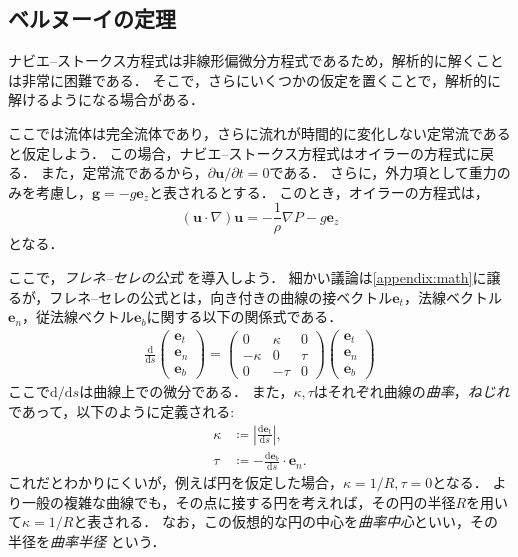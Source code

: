 \documentclass[uplatex,dvipdfmx,a4j,11pt]{jsreport}
\newcommand{\e}{\mathbf{e}} %
\newcommand{\diff}{\mathrm{d}} %
\numberwithin{equation}{chapter}
\begin{document}
\subsection{ベルヌーイの定理}

ナビエ--ストークス方程式は非線形偏微分方程式であるため，解析的に解くことは非常に困難である．
そこで，さらにいくつかの仮定を置くことで，解析的に解けるようになる場合がある．

ここでは流体は完全流体であり，さらに流れが時間的に変化しない定常流であると仮定しよう．
この場合，ナビエ--ストークス方程式はオイラーの方程式に戻る．
また，定常流であるから，$\partial \mathbf{u}/\partial t = 0$である．
さらに，外力項として重力のみを考慮し，$\mathbf{g} = -g \e_z$と表されるとする．
このとき，オイラーの方程式は， 
\begin{equation*}
  (\mathbf{u}\cdot \nabla)\mathbf{u} = -\frac{1}{\rho} \nabla P - g \e_z
\end{equation*}
となる．

ここで，\emph{フレネ--セレの公式} を導入しよう．
細かい議論は\cref{appendix:math}に譲るが，フレネ--セレの公式とは，向き付きの曲線の接ベクトル$\e_t$，法線ベクトル$\e_n$，従法線ベクトル$\e_b$に関する以下の関係式である．
\begin{align*}
  \frac{\diff }{\diff s}
  \begin{pmatrix}
    \e_t \\
    \e_n \\
    \e_b
  \end{pmatrix}
  =
  \begin{pmatrix}
    0 & \kappa & 0\\
    -\kappa & 0 & \tau\\
    0 & -\tau & 0
  \end{pmatrix}
  \begin{pmatrix}
    \e_t \\
    \e_n \\
    \e_b
  \end{pmatrix}
\end{align*}
ここで$\diff/\diff s$は曲線上での微分である．
また，$\kappa, \tau$はそれぞれ曲線の\emph{曲率}，\emph{ねじれ}であって，以下のように定義される:
\begin{align*}
  \kappa &\coloneqq \left|\frac{\diff \e_t}{\diff s}\right|,\\
  \tau &\coloneqq -\frac{\diff \e_b}{\diff s} \cdot \e_n.
\end{align*}
これだとわかりにくいが，例えば円を仮定した場合，$\kappa = 1/R, \tau = 0$となる．
より一般の複雑な曲線でも，その点に接する円を考えれば，その円の半径$R$を用いて$\kappa = 1/R$と表される．
なお，この仮想的な円の中心を\emph{曲率中心}といい，その半径を\emph{曲率半径} という．
\end{document}
